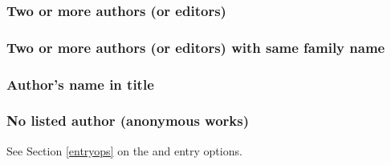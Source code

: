 \documentclass[11pt,letterpaper,oneside]{article}
\begin{document}
\subsubsection{Two or more authors (or editors)}
\label{14.76}

\begin{citebib}
\item \cite[xvi]{sorrells2015}
\item \cite[20--21]{levitt2005}
\item \cite[422]{umbers2015}
\item \cite[xx-xxi]{sorrells2015}
\item \cite[158]{gmuca2015}
\item \cite[160]{gmuca2015}
\end{citebib}

\subsubsection{Two or more authors (or editors) with same family name}

\begin{citebib}
\item \cite[14]{kendris2010}
\item \cite[27--28]{kendris2010}
\end{citebib}

\subsubsection{Author's name in title}
\label{14.78}

\begin{citebib}
\item \cite*[233]{franklin1868}
\item \cite*[234]{franklin1868}
\end{citebib}

\subsubsection{No listed author (anonymous works)}
\label{14.79}

See Section \ref{entryops} on the  and 
entry options.

\begin{citebib}
\item \cite{anon1610}
\item \cite{anon1547}
\item \cite{horsley1796}
\item \cite{hawkes1834}
\end{citebib}
\end{document}
